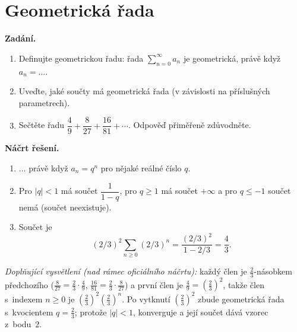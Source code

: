 \section{Geometrická řada}

\noindent\textbf{Zadání.}\par
\begin{enumerate}
  \item Definujte geometrickou řadu: řada $\sum_{n=0}^{\infty} a_n$ je geometrická, právě když $a_n = \dots$.
  \item Uveďte, jaké součty má geometrická řada (v závislosti na příslušných parametrech).
  \item Sečtěte řadu $\dfrac{4}{9} + \dfrac{8}{27} + \dfrac{16}{81} + \cdots$. Odpověď přiměřeně zdůvodněte.
\end{enumerate}

\medskip
\noindent\textbf{Náčrt řešení.}\par
\begin{enumerate}
  \item $\dots$ právě když $a_n = q^n$ pro nějaké reálné číslo $q$.
  \item Pro $|q| < 1$ má součet $\dfrac{1}{1-q}$, pro $q \geq 1$ má součet $+\infty$ a pro $q \leq -1$ součet nemá (součet neexistuje).
  \item Součet je
    \[
      (2/3)^2 \sum_{n \geq 0} (2/3)^n = \frac{(2/3)^2}{1 - 2/3} = \frac{4}{3}.
    \]
\end{enumerate}

\medskip
\noindent\textit{Doplňující vysvětlení (nad rámec oficiálního náčrtu):} každý člen je $\tfrac23$-násobkem předchozího ($\tfrac{8}{27}=\tfrac23\cdot\tfrac49$, $\tfrac{16}{81}=\tfrac23\cdot\tfrac{8}{27}$) a první člen je $\tfrac49=(\tfrac23)^2$, takže člen s~indexem $n\ge0$ je $(\tfrac23)^2(\tfrac23)^n$. Po vytknutí $(\tfrac23)^2$ zbude geometrická řada s~kvocientem $q=\tfrac23$; protože $|q|<1$, konverguje a její součet dává vzorec z~bodu~2.
